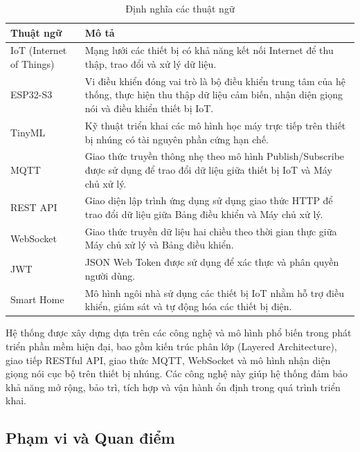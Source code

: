 \documentclass[a4paper,12pt]{article}
\begin{document}
\renewcommand{\arraystretch}{1.3}
\begin{table}[H]
    \centering
    \caption{Định nghĩa các thuật ngữ}
    \label{tab:definition}
    \small
    \begin{tabularx}{\linewidth}{|p{3.3cm}|X|}
        \hline
        \textbf{Thuật ngữ} & \textbf{Mô tả} \\
        \hline
        IoT (Internet of Things) & Mạng lưới các thiết bị có khả năng kết nối Internet để thu thập, trao đổi và xử lý dữ liệu. \\
        \hline
        ESP32-S3 & Vi điều khiển đóng vai trò là bộ điều khiển trung tâm của hệ thống, thực hiện thu thập dữ liệu cảm biến, nhận diện giọng nói và điều khiển thiết bị IoT. \\
        \hline
        TinyML & Kỹ thuật triển khai các mô hình học máy trực tiếp trên thiết bị nhúng có tài nguyên phần cứng hạn chế. \\
        \hline
        MQTT & Giao thức truyền thông nhẹ theo mô hình Publish/Subscribe được sử dụng để trao đổi dữ liệu giữa thiết bị IoT và Máy chủ xử lý. \\
        \hline
        REST API & Giao diện lập trình ứng dụng sử dụng giao thức HTTP để trao đổi dữ liệu giữa Bảng điều khiển và Máy chủ xử lý. \\
        \hline
        WebSocket & Giao thức truyền dữ liệu hai chiều theo thời gian thực giữa Máy chủ xử lý và Bảng điều khiển. \\
        \hline
        JWT & JSON Web Token được sử dụng để xác thực và phân quyền người dùng. \\
        \hline
        Smart Home & Mô hình ngôi nhà sử dụng các thiết bị IoT nhằm hỗ trợ điều khiển, giám sát và tự động hóa các thiết bị điện. \\
        \hline
    \end{tabularx}
\end{table}

Hệ thống được xây dựng dựa trên các công nghệ và mô hình phổ biến trong phát triển phần mềm hiện đại, bao gồm kiến trúc phân lớp (Layered Architecture), giao tiếp RESTful API, giao thức MQTT, WebSocket và mô hình nhận diện giọng nói cục bộ trên thiết bị nhúng. Các công nghệ này giúp hệ thống đảm bảo khả năng mở rộng, bảo trì, tích hợp và vận hành ổn định trong quá trình triển khai.

\subsection{Phạm vi và Quan điểm}
\end{document}
